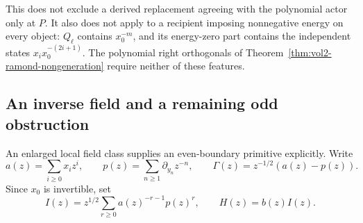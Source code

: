 This does not exclude a derived replacement agreeing with
the polynomial actor only at \(P\). It also does not apply
to a recipient imposing nonnegative energy on every object:
\(Q_\ell\) contains \(x_0^{-m}\), and its energy-zero part
contains the independent states
\(x_i x_0^{-(2i+1)}\). The polynomial right orthogonals of
Theorem~\ref{thm:vol2-ramond-nongeneration} require neither
of these features.

\subsection{An inverse field and a remaining odd obstruction}

An enlarged local field class supplies an even-boundary
primitive explicitly. Write
\[
 a(z)=\sum_{i\ge0}x_i z^i,\qquad
 p(z)=\sum_{n\ge1}\partial_{y_n}z^{-n},\qquad
 \Gamma(z)=z^{-1/2}(a(z)-p(z)).
\]
Since \(x_0\) is invertible, set
\begin{equation}\label{eq:vol2-local-inverse-field}
 I(z)=z^{1/2}\sum_{r\ge0}a(z)^{-r-1}p(z)^r,\qquad
 H(z)=b(z)I(z).
\end{equation}

